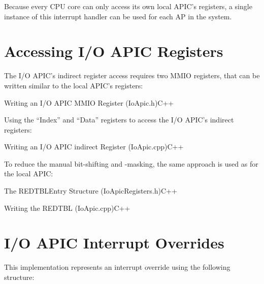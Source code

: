 Because every CPU core can only access its own local APIC's registers, a single instance of this
interrupt handler can be used for each AP in the system.

\clearpage %

\section{Accessing I/O APIC Registers}
\label{sec:iolistings}

The I/O APIC's indirect register access requires two MMIO registers, that can be written similar to
the local APIC's registers:

\begin{codeblock}{Writing an I/O APIC MMIO Register (IoApic.h)}{C++}
\end{codeblock}

Using the ``Index'' and ``Data'' registers to access the I/O APIC's indirect registers:

\begin{codeblock}{Writing an I/O APIC indirect Register (IoApic.cpp)}{C++}
\end{codeblock}

To reduce the manual bit-shifting and -masking, the same approach is used as for the local APIC:

\begin{codeblock}[label=lst:redtblentry]{The REDTBLEntry Structure (IoApicRegisters.h)}{C++}
\end{codeblock}

\begin{codeblock}[label=lst:writeredtbl]{Writing the REDTBL (IoApic.cpp)}{C++}
\end{codeblock}


\section{I/O APIC Interrupt Overrides}
\label{sec:apxirqoverrides}

This implementation represents an interrupt override using the following structure:

